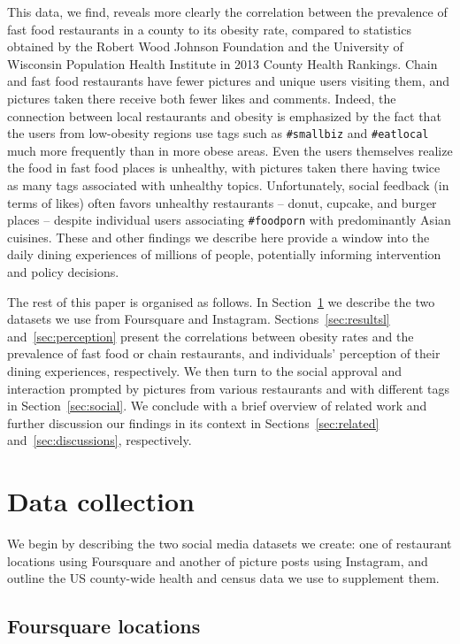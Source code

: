 \documentclass{sig-alternate-2013}
\begin{document}
This data, we find, reveals more clearly the correlation between the prevalence of fast food restaurants in a county to its obesity rate, compared to statistics obtained by the Robert Wood Johnson Foundation and the University of Wisconsin Population Health Institute in 2013 County Health Rankings. Chain and fast food restaurants have fewer pictures and unique users visiting them, and pictures taken there receive both fewer likes and comments. Indeed, the connection between local restaurants and obesity is emphasized by the fact that the users from low-obesity regions use tags such as \texttt{\#smallbiz} and \texttt{\#eatlocal} much more frequently than in more obese areas. Even the users themselves realize the food in fast food places is unhealthy, with pictures taken there having twice as many tags associated with unhealthy topics. Unfortunately, social feedback (in terms of likes) often favors unhealthy restaurants -- donut, cupcake, and burger places -- despite individual users associating \texttt{\#foodporn} with predominantly Asian cuisines. These and other findings we describe here provide a window into the daily dining experiences of millions of people, potentially informing intervention and policy decisions.

The rest of this paper is organised as follows. In Section~\ref{sec:data} we describe the two datasets we use from Foursquare and Instagram. Sections~\ref{sec:resultsl} and~\ref{sec:perception} present the correlations between obesity rates and the prevalence of fast food or chain restaurants, and individuals' perception of their dining experiences, respectively. We then turn to the social approval and interaction prompted by pictures from various restaurants and with different tags in Section~\ref{sec:social}. We conclude with a brief overview of related work and further discussion our findings in its context in Sections~\ref{sec:related} and~\ref{sec:discussions}, respectively.



\section{Data collection}
\label{sec:data}

We begin by describing the two social media datasets we create: one of restaurant locations using Foursquare and another of picture posts using Instagram, and outline the US county-wide health and census data we use to supplement them.

\subsection{Foursquare locations}
\end{document}
